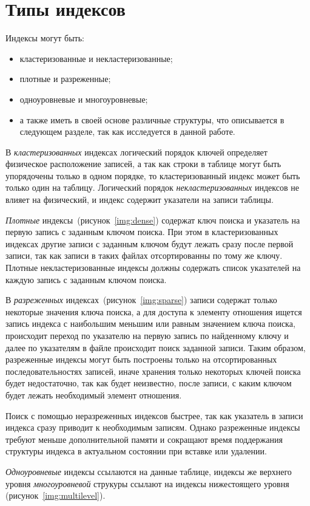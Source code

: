 \section{Типы индексов}

Индексы могут быть:
\begin{itemize}
    \item кластеризованные и некластеризованные;
    \item плотные и разреженные;
    \item одноуровневые и многоуровневые;
    \item а также иметь в своей основе различные структуры, что описывается в
        следующем разделе, так как исследуется в данной работе.
\end{itemize}

 В \textit{кластеризованных} индексах логический порядок ключей определяет
 физическое расположение записей, а так как строки в таблице могут быть
 упорядочены только в одном порядке, то кластеризованный индекс может быть
 только один на таблицу. Логический порядок \textit{некластеризованных} индексов
 не влияет на физический, и индекс содержит указатели на записи таблицы.

\textit{Плотные} индексы~(рисунок~\ref{img:dense}) содержат ключ поиска и
указатель на первую запись с заданным ключом поиска. При этом в кластеризованных
индексах другие записи с заданным ключом будут лежать сразу после первой записи,
так как записи в таких файлах отсортированны по тому же ключу. Плотные
некластеризованные индексы должны содержать список указателей на каждую запись с
заданным ключом поиска.
 

В \textit{разреженных} индексах~(рисунок~\ref{img:sparse}) записи содержат
только некоторые значения ключа поиска, а для доступа к элементу отношения
ищется запись индекса с наибольшим меньшим или равным значением ключа поиска,
происходит переход по указателю на первую запись по найденному ключу и далее по
указателям в файле происходит поиск заданной записи. Таким образом, разреженные
индексы могут быть построены только на отсортированных последовательностях
записей, иначе хранения только некоторых ключей поиска будет недостаточно, так
как будет неизвестно, после записи, с каким ключом будет лежать необходимый
элемент отношения.


Поиск с помощью неразреженных индексов быстрее, так как указатель в записи
индекса сразу приводит к необходимым записям. Однако разреженные индексы требуют
меньше дополнительной памяти и сокращают время поддержания структуры индекса в
актуальном состоянии при вставке или удалении.

\textit{Одноуровневые} индексы ссылаются на данные таблице, индексы же верхнего уровня
\textit{многоуровневой} струкуры ссылают на индексы нижестоящего уровня
(рисунок~\ref{img:multilevel}).


